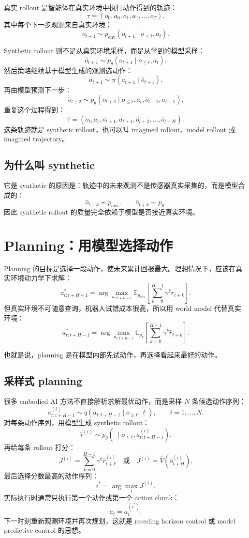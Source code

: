 \documentclass[11pt,a4paper]{ctexart}
\begin{document}
真实 rollout 是智能体在真实环境中执行动作得到的轨迹：
\[
  \tau =
  (o_0,a_0,o_1,a_1,\ldots,o_T).
\]
其中每个下一步观测来自真实环境：
\[
  o_{t+1}\sim p_{\mathrm{env}}(o_{t+1}\mid o_{\le t},a_t).
\]

Synthetic rollout 则不是从真实环境采样，而是从学到的模型采样：
\[
  \hat{o}_{t+1}\sim p_\theta(o_{t+1}\mid o_{\le t},a_t).
\]
然后策略继续基于模型生成的观测选动作：
\[
  a_{t+1}\sim \pi(a_{t+1}\mid \hat{o}_{t+1}).
\]
再由模型预测下一步：
\[
  \hat{o}_{t+2}\sim p_\theta(o_{t+2}\mid o_{\le t},a_t,\hat{o}_{t+1},a_{t+1}).
\]
重复这个过程得到：
\[
  \hat{\tau}
  =
  (o_t,a_t,\hat{o}_{t+1},a_{t+1},\hat{o}_{t+2},\ldots,\hat{o}_{t+H}).
\]
这条轨迹就是 synthetic rollout，也可以叫 imagined rollout、model rollout 或 imagined trajectory。

\subsection{为什么叫 synthetic}

它是 synthetic 的原因是：轨迹中的未来观测不是传感器真实采集的，而是模型合成的：
\[
  \hat{o}_{t+k}\not\sim p_{\mathrm{env}},
  \qquad
  \hat{o}_{t+k}\sim p_\theta.
\]
因此 synthetic rollout 的质量完全依赖于模型是否接近真实环境。

\section{Planning：用模型选择动作}

Planning 的目标是选择一段动作，使未来累计回报最大。理想情况下，应该在真实环境动力学下求解：
\[
  a_{t:t+H-1}^*
  =
  \arg\max_{a_{t:t+H-1}}
  \mathbb{E}_{p_{\mathrm{env}}}
  \left[
    \sum_{k=0}^{H-1}\gamma^k r_{t+k}
  \right].
\]
但真实环境不可随意查询，机器人试错成本很高，所以用 world model 代替真实环境：
\[
  a_{t:t+H-1}^*
  =
  \arg\max_{a_{t:t+H-1}}
  \mathbb{E}_{p_\theta}
  \left[
    \sum_{k=0}^{H-1}\gamma^k \hat{r}_{t+k}
  \right].
\]

也就是说，planning 是在模型内部先试动作，再选择看起来最好的动作。

\subsection{采样式 planning}

很多 embodied AI 方法不直接解析求解最优动作，而是采样 $N$ 条候选动作序列：
\[
  a_{t:t+H-1}^{(i)}\sim q(a_{t:t+H-1}\mid o_{\le t},\ell),
  \qquad i=1,\ldots,N.
\]
对每条动作序列，用模型生成 synthetic rollout：
\[
  \hat{\tau}^{(i)}\sim p_\theta(\cdot\mid o_{\le t},a_{t:t+H-1}^{(i)}).
\]
再给每条 rollout 打分：
\[
  J^{(i)}
  =
  \sum_{k=0}^{H-1}\gamma^k \hat{r}_{t+k}^{(i)}
  \quad \text{或} \quad
  J^{(i)}=\hat{V}(\hat{o}_{t+H}^{(i)}).
\]
最后选择分数最高的动作序列：
\[
  i^*=\arg\max_i J^{(i)}.
\]
实际执行时通常只执行第一个动作或第一个 action chunk：
\[
  a_t = a_t^{(i^*)}.
\]
下一时刻重新观测环境并再次规划，这就是 receding horizon control 或 model predictive control 的思想。
\end{document}
